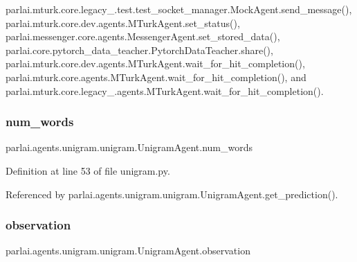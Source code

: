 parlai.\+mturk.\+core.\+legacy\+\_.\+test.\+test\+\_\+socket\+\_\+manager.\+Mock\+Agent.\+send\+\_\+message(), parlai.\+mturk.\+core.\+dev.\+agents.\+M\+Turk\+Agent.\+set\+\_\+status(), parlai.\+messenger.\+core.\+agents.\+Messenger\+Agent.\+set\+\_\+stored\+\_\+data(), parlai.\+core.\+pytorch\+\_\+data\+\_\+teacher.\+Pytorch\+Data\+Teacher.\+share(), parlai.\+mturk.\+core.\+dev.\+agents.\+M\+Turk\+Agent.\+wait\+\_\+for\+\_\+hit\+\_\+completion(), parlai.\+mturk.\+core.\+agents.\+M\+Turk\+Agent.\+wait\+\_\+for\+\_\+hit\+\_\+completion(), and parlai.\+mturk.\+core.\+legacy\+\_.\+agents.\+M\+Turk\+Agent.\+wait\+\_\+for\+\_\+hit\+\_\+completion().

\mbox{\label{classparlai_1_1agents_1_1unigram_1_1unigram_1_1UnigramAgent_a115f363de67abb097c3abf3ffe99a1da}} 
\subsubsection{\texorpdfstring{num\+\_\+words}{num\_words}}
{\footnotesize\ttfamily parlai.\+agents.\+unigram.\+unigram.\+Unigram\+Agent.\+num\+\_\+words}



Definition at line 53 of file unigram.\+py.



Referenced by parlai.\+agents.\+unigram.\+unigram.\+Unigram\+Agent.\+get\+\_\+prediction().

\mbox{\label{classparlai_1_1agents_1_1unigram_1_1unigram_1_1UnigramAgent_a590ee9adde9db2a7f65b28455e966a1b}} 
\subsubsection{\texorpdfstring{observation}{observation}}
{\footnotesize\ttfamily parlai.\+agents.\+unigram.\+unigram.\+Unigram\+Agent.\+observation}



